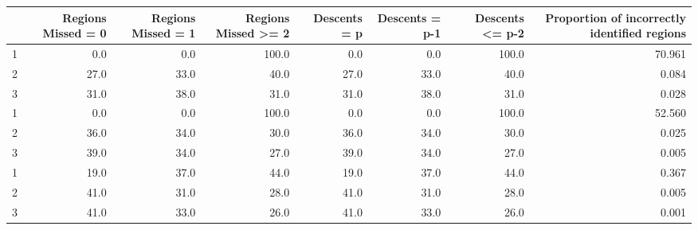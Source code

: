 \begin{tabular}{lrrrrrrr}
\toprule
{} &  Regions Missed = 0 &  Regions Missed = 1 &  Regions Missed >= 2 &  Descents = p &  Descents = p-1 &  Descents <= p-2 &  Proportion of incorrectly identified regions \\
\midrule
1 &                 0.0 &                 0.0 &                100.0 &           0.0 &             0.0 &            100.0 &                                        70.961 \\
2 &                27.0 &                33.0 &                 40.0 &          27.0 &            33.0 &             40.0 &                                         0.084 \\
3 &                31.0 &                38.0 &                 31.0 &          31.0 &            38.0 &             31.0 &                                         0.028 \\
1 &                 0.0 &                 0.0 &                100.0 &           0.0 &             0.0 &            100.0 &                                        52.560 \\
2 &                36.0 &                34.0 &                 30.0 &          36.0 &            34.0 &             30.0 &                                         0.025 \\
3 &                39.0 &                34.0 &                 27.0 &          39.0 &            34.0 &             27.0 &                                         0.005 \\
1 &                19.0 &                37.0 &                 44.0 &          19.0 &            37.0 &             44.0 &                                         0.367 \\
2 &                41.0 &                31.0 &                 28.0 &          41.0 &            31.0 &             28.0 &                                         0.005 \\
3 &                41.0 &                33.0 &                 26.0 &          41.0 &            33.0 &             26.0 &                                         0.001 \\
\bottomrule
\end{tabular}
